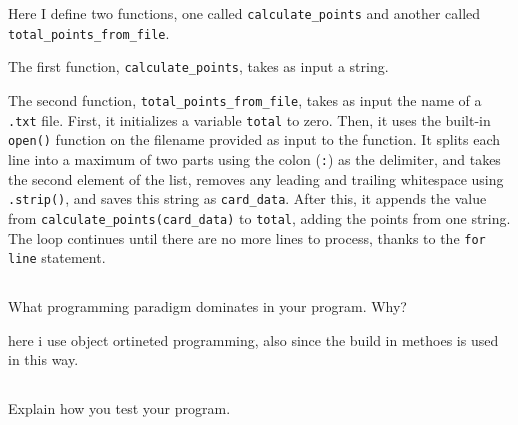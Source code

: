 \documentclass{article}
\begin{document}
Here I define two functions, one called \texttt{calculate\_points} and another called \texttt{total\_points\_from\_file}.

The first function, \texttt{calculate\_points}, takes as input a string.

The second function, \texttt{total\_points\_from\_file}, takes as input the name of a \texttt{.txt} file. First, it initializes a variable \texttt{total} to zero. Then, it uses the built-in \texttt{open()} function on the filename provided as input to the function. It splits each line into a maximum of two parts using the colon (\texttt{:}) as the delimiter, and takes the second element of the list, removes any leading and trailing whitespace using \texttt{.strip()}, and saves this string as \texttt{card\_data}. After this, it appends the value from \texttt{calculate\_points(card\_data)} to \texttt{total}, adding the points from one string. The loop continues until there are no more lines to process, thanks to the \texttt{for line} statement.



\subsection{}

What programming paradigm dominates in your program. Why?

here i use object ortineted programming, also since the build in methoes is used in this way.


\subsection{}


Explain how you test your program.


\section{}




\subsection{}
\end{document}
